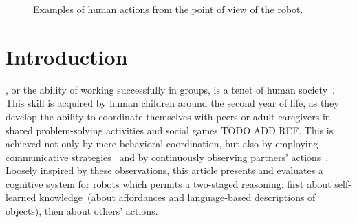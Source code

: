 
\begin{figure*}
  \centering


  \caption{Examples of human actions from the point of view of the robot.}
  \label{fig:action_examples}
\end{figure*}

\section{Introduction}
\label{sec:intro}

, or the ability of working successfully in groups, is a tenet of human society~\cite{turner:1975}.
This skill is acquired by human children around the second year of life, as they develop the ability to coordinate themselves with peers or adult caregivers in shared problem-solving activities and social games TODO ADD REF.
This is achieved not only by mere behavioral coordination, but also by employing communicative strategies~\cite{melis:2010:rstb} and by continuously observing partners' actions~\cite{ramnani:2004:natureneuro}.
Loosely inspired by these observations, this article presents and evaluates a cognitive system for robots which permits a two-staged reasoning: first about self-learned knowledge~(about affordances and language-based descriptions of objects), then about others' actions.

